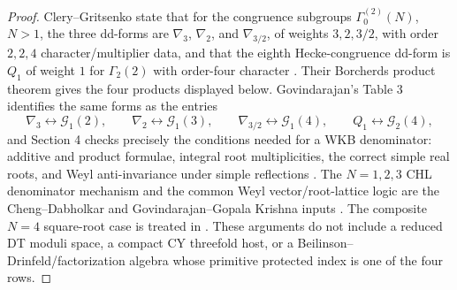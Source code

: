 \begin{proof}
Clery--Gritsenko state that for the congruence subgroups
\(\Gamma_0^{(2)}(N)\), \(N>1\), the three dd-forms are
\(\nabla_3\), \(\nabla_2\), and \(\nabla_{3/2}\), of weights
\(3,2,3/2\), with order \(2,2,4\) character/multiplier data, and that the
eighth Hecke-congruence dd-form is \(Q_1\) of weight \(1\) for
\(\Gamma_2(2)\) with order-four character \cite{GC}.  Their Borcherds
product theorem gives the four products displayed below.  Govindarajan's
Table 3 identifies the same forms as the entries
\[
\nabla_3\leftrightarrow \mathcal G_1(2),\qquad
\nabla_2\leftrightarrow \mathcal G_1(3),\qquad
\nabla_{3/2}\leftrightarrow \mathcal G_1(4),\qquad
Q_1\leftrightarrow \mathcal G_2(4),
\]
and Section 4 checks precisely the conditions needed for a WKB denominator:
additive and product formulae, integral root multiplicities, the correct
simple real roots, and Weyl anti-invariance under simple reflections
\cite{Gov11BKM}.  The \(N=1,2,3\) CHL denominator mechanism and the common
Weyl vector/root-lattice logic are the Cheng--Dabholkar and
Govindarajan--Gopala Krishna inputs \cite{CD09BKM,GK09CHL}.  The composite
\(N=4\) square-root case is treated in \cite{GK10Composite}.  These arguments
do not include a reduced DT moduli space, a compact CY threefold host, or a
Beilinson--Drinfeld/factorization algebra whose primitive protected index is
one of the four rows.
\end{proof}

